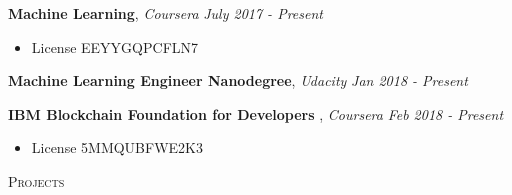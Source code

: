 \documentclass[10pt]{article}
\newenvironment{changemargin}[2]{
  \begin{list}{}{
    \setlength{\topsep}{0pt}
    \setlength{\leftmargin}{#1}
    \setlength{\rightmargin}{#2}
    \setlength{\listparindent}{\parindent}
    \setlength{\itemindent}{\parindent}
    \setlength{\parsep}{\parskip}
  }
  \item[]}{\end{list}
}
\newcommand{\lineover}{
	\begin{changemargin}{-0.05in}{-0.05in}
		\vspace*{-8pt}
		\hrulefill \\
		\vspace*{-2pt}
	\end{changemargin}
}
\newcommand{\header}[1]{
	\begin{changemargin}{-0.5in}{-0.5in}
		\scshape{#1}\\
  	\lineover
	\end{changemargin}
}
\newcommand{\labdescription}[1]{
	\begin{changemargin}{0.15in}{0.15in}
    \smallskip
		{#1}
    \medskip
	\end{changemargin}
}
\newcommand{\labtitle}[3]{
	\textbf{#1}, \emph{#2} \hfill \emph{#3}\\
}
\newenvironment{body} {
	\vspace*{-16pt}
	\begin{changemargin}{-0.25in}{-0.5in}
  }
	{\end{changemargin}
}
\begin{document}
\begin{body}
	\vspace{14pt}

  	\labtitle{Machine Learning}{Coursera}{July 2017 - Present}
  \labdescription {
  	\begin{itemize} \itemsep -0pt  %
      \item License EEYYGQPCFLN7
  	\end{itemize}
  }
  
  	\labtitle{Machine Learning Engineer Nanodegree}{Udacity}{Jan 2018 - Present}
  \labdescription {
  	\begin{itemize} \itemsep -0pt  %
  	\end{itemize}
  }
  
  	\labtitle{IBM Blockchain Foundation for Developers }{Coursera}{Feb 2018 - Present}
  \labdescription {
  	\begin{itemize} \itemsep -0pt  %
      \item License 5MMQUBFWE2K3
  	\end{itemize}
  }

\end{body}

\medskip



\header{Projects}
\end{document}
